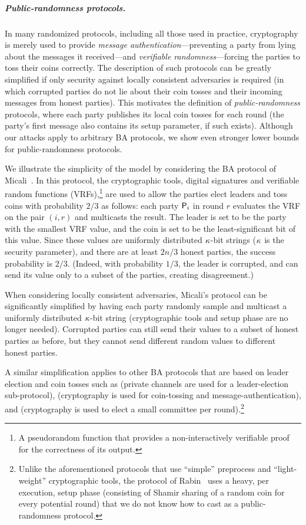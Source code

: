 \subparagraph{Public-randomness protocols.}
In many randomized protocols, including all those used in practice, cryptography is merely used to provide \emph{message authentication}---preventing a party from lying about the messages it received---and \emph{verifiable randomness}---forcing the parties to toss their coins correctly. The description of such protocols can be greatly simplified if only security against locally consistent adversaries is required (in which corrupted parties do not lie about their coin tosses and their incoming messages from honest parties). This motivates the definition of \emph{public-randomness} protocols, where each party publishes its local coin tosses for each round (the party's first message also contains its setup parameter, if such exists).
Although our attacks apply to arbitrary BA protocols, we show even stronger lower bounds for public-randomness protocols.

We illustrate the simplicity of the model by considering the BA protocol of Micali~\cite{Micali17}. In this protocol, the cryptographic tools, digital signatures and verifiable random functions (VRFs),\footnote{A pseudorandom function that provides a non-interactively verifiable proof for the correctness of its output.} are used to allow the parties elect leaders and toss coins with probability $2/3$ as follows: each party $\mathsf{P}_i$ in round $r$ evaluates the VRF on the pair $(i,r)$ and multicasts the result. The leader is set to be the party with the smallest VRF value, and the coin is set to be the least-significant bit of this value. Since these values are uniformly distributed $\kappa$-bit strings ($\kappa$ is the security parameter), and there are at least $2n/3$ honest parties, the success probability is $2/3$. (Indeed, with probability $1/3$, the leader is corrupted, and can send its value only to a subset of the parties, creating disagreement.)

When considering locally consistent adversaries, Micali's protocol can be significantly simplified by having each party randomly sample and multicast a uniformly distributed $\kappa$-bit string (cryptographic tools and setup phase are no longer needed). Corrupted parties can still send their values to a subset of honest parties as before, but they cannot send different random values to different honest parties.

A similar simplification applies to other BA protocols that are based on leader election and coin tosses such as \cite{FM97,FG03,KK06} (private channels are used for a leader-election sub-protocol), \cite{MV17,ADDNR19} (cryptography is used for coin-tossing and message-authentication), and \cite{SM16,ACDNPRS19} (cryptography is used to elect a small committee per round).\footnote{Unlike the aforementioned protocols that use ``simple'' preprocess and ``light-weight'' cryptographic tools, the protocol of Rabin~\cite{Rabin83} uses a heavy, per execution, setup phase (consisting of Shamir sharing of a random coin for every potential round) that we do not know how to cast as a public-randomness protocol.}

